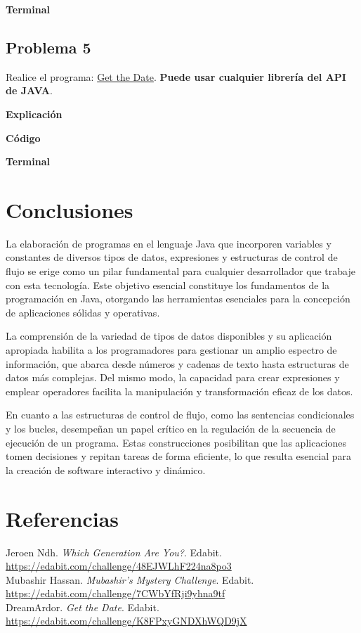 \documentclass[11pt, twocolumn]{article}
\begin{document}

  \textbf{Terminal}

  \subsection*{Problema 5}
  Realice el programa:  \href{https://edabit.com/challenge/48EJWLhF224na8po3}{Get the Date}. \textbf{Puede usar cualquier librería del API de JAVA}.

  \textbf{Explicación} 
  

  \textbf{Código}


  \textbf{Terminal}


  \section*{Conclusiones}
  La elaboración de programas en el lenguaje Java que incorporen variables y constantes de diversos tipos de datos, expresiones y estructuras de control de flujo se erige como un pilar fundamental para cualquier desarrollador que trabaje con esta tecnología. Este objetivo esencial constituye los fundamentos de la programación en Java, otorgando las herramientas esenciales para la concepción de aplicaciones sólidas y operativas.

  La comprensión de la variedad de tipos de datos disponibles y su aplicación apropiada habilita a los programadores para gestionar un amplio espectro de información, que abarca desde números y cadenas de texto hasta estructuras de datos más complejas. Del mismo modo, la capacidad para crear expresiones y emplear operadores facilita la manipulación y transformación eficaz de los datos.

  En cuanto a las estructuras de control de flujo, como las sentencias condicionales y los bucles, desempeñan un papel crítico en la regulación de la secuencia de ejecución de un programa. Estas construcciones posibilitan que las aplicaciones tomen decisiones y repitan tareas de forma eficiente, lo que resulta esencial para la creación de software interactivo y dinámico.

  \section*{Referencias}
  \small
  Jeroen Ndh. \textit{Which Generation Are You?}. Edabit. \url{https://edabit.com/challenge/48EJWLhF224na8po3} \\

  Mubashir Hassan. \textit{Mubashir's Mystery Challenge}. Edabit. \url{https://edabit.com/challenge/7CWbYfRji9yhna9tf} \\

  DreamArdor. \textit{Get the Date}. Edabit. \url{https://edabit.com/challenge/K8FPxyGNDXhWQD9jX}
\end{document}
